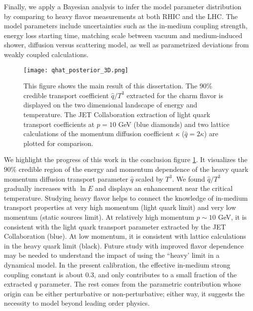 Finally, we apply a Bayesian analysis to infer the model parameter distribution by comparing to heavy flavor measurements at both RHIC and the LHC.
The model parameters include uncertainties such as the in-medium coupling strength, energy loss starting time, matching scale between vacuum and medium-induced shower, diffusion versus scattering model, as well as parametrized deviations from weakly coupled calculations.

\begin{figure}
\singlespacing
\centering
\texttt{[image: qhat\_posterior\_3D.png]}
\caption[This figure shows the main result of this dissertation. The 90\%]{This figure shows the main result of this dissertation. The 90\% credible transport coefficient $\hat{q}/T^3$ extracted for the charm flavor is displayed on the two dimensional landscape of energy and temperature. The JET Collaboration extraction of light quark transport coefficients at $p=10$ GeV \cite{Burke:2013yra} (blue diamonds) and two lattice calculations of the momentum diffusion coefficient $\kappa$ ($\hat{q}=2\kappa$) \cite{Ding:2012sp,Banerjee:2011ra} are plotted for comparison.}
\label{fig:conclusion}
\end{figure}

We highlight the progress of this work in the conclusion figure \ref{fig:conclusion}.
It visualizes the $90\%$ credible region of the energy and momentum dependence of the heavy quark momentum diffusion transport parameter $\hat{q}$ scaled by $T^3$.
We found $\hat{q}/T^3$ gradually increases with $\ln E$ and displays an enhancement near the critical temperature.
Studying heavy flavor helps to connect the knowledge of in-medium transport properties at very high momentum (light quark limit) and very low momentum (static sources limit).
At relatively high momentum $p\sim 10$ GeV, it is consistent with the light quark transport parameter extracted by the JET Collaboration (blue).
At low momentum, it is consistent with lattice calculations in the heavy quark limit (black).
Future study with improved flavor dependence may be needed to understand the impact of using the ``heavy' limit in a dynamical model.
In the present calibration, the effective in-medium strong coupling constant is about $0.3$, and only contributes to a small fraction of the extracted $\hat{q}$ parameter.
The rest comes from the parametric contribution whose origin can be either perturbative or non-perturbative; either way, it suggests the necessity to model beyond leading order physics.

